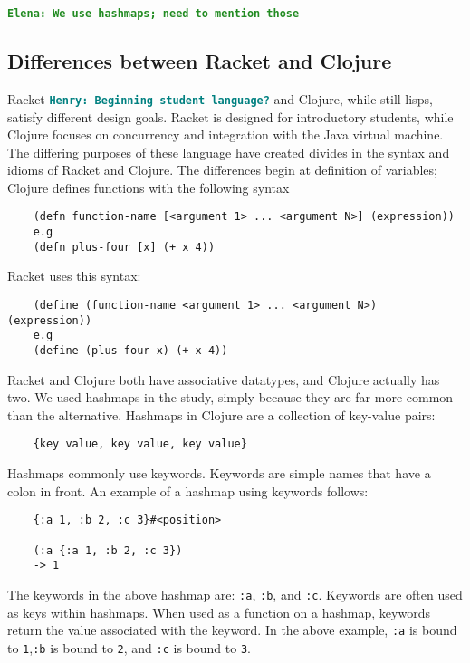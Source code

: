 \documentclass[12pt]{article}
\newcommand{\comment}[1]{{\bf \tt  {#1}}}
\newcommand{\emcomment}[1]{\textcolor{ForestGreen}{\comment{Elena: {#1}}}}
\newcommand{\hfcomment}[1]{\textcolor{Teal}{\comment{Henry: {#1}}}}
\begin{document}
\emcomment{We use hashmaps; need to mention those}
	\subsection{Differences between Racket and Clojure}\label{sec:diff}
	
Racket \hfcomment{Beginning student language?} and Clojure, while still lisps, satisfy different design goals. 
Racket is designed for introductory students, while Clojure focuses on concurrency and integration with the Java virtual machine. 
The differing purposes of these language have created divides in the syntax and idioms of Racket and Clojure.
 The differences begin at definition of variables; Clojure defines functions with the following syntax

\begin{verbatim}
	(defn function-name [<argument 1> ... <argument N>] (expression))
	e.g
	(defn plus-four [x] (+ x 4))
\end{verbatim}
Racket uses this syntax:
\begin{verbatim}
	(define (function-name <argument 1> ... <argument N>) (expression))
	e.g
	(define (plus-four x) (+ x 4))
\end{verbatim}

Racket and Clojure both have associative datatypes, and Clojure actually has two. We used hashmaps in the study, simply because they are far more common than the alternative.
Hashmaps in Clojure are a collection of key-value pairs: 

\begin{verbatim}
	{key value, key value, key value}
\end{verbatim}

Hashmaps commonly use keywords. Keywords are simple names that have a colon in front.
An example of a hashmap using keywords follows: 

\begin{verbatim}
	{:a 1, :b 2, :c 3}#<position>
	
	(:a {:a 1, :b 2, :c 3})
	-> 1
\end{verbatim}

The keywords in the above hashmap are: \texttt{:a}, \texttt{:b}, and \texttt{:c}.
Keywords are often used as keys within hashmaps. 
When used as a function on a hashmap, keywords return the value associated with the keyword. 
In the above example, \texttt{:a} is bound to \texttt{1},\texttt{:b} is bound to \texttt{2}, and \texttt{:c} is bound to \texttt{3}.
\end{document}
